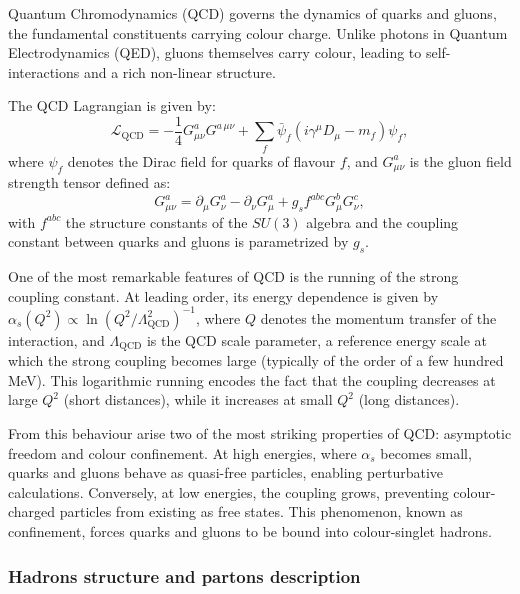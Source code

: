 Quantum Chromodynamics (QCD) governs the dynamics of quarks and gluons, the fundamental constituents carrying colour charge. Unlike photons in Quantum Electrodynamics (QED), gluons themselves carry colour, leading to self-interactions and a rich non-linear structure.

The QCD Lagrangian is given by:
\begin{equation}
\mathcal{L}_{\mathrm{QCD}} = -\frac{1}{4} G^{a}_{\mu\nu} G^{a\,\mu\nu} + \sum_{f} \bar{\psi}_f \left( i \gamma^\mu D_\mu - m_f \right) \psi_f,
\end{equation}
where \(\psi_f\) denotes the Dirac field for quarks of flavour \(f\), and \(G^a_{\mu\nu}\) is the gluon field strength tensor defined as:
\begin{equation}
G^a_{\mu\nu} = \partial_\mu G^a_\nu - \partial_\nu G^a_\mu + g_s f^{abc} G^b_\mu G^c_\nu,
\end{equation}
with \(f^{abc}\) the structure constants of the \(SU(3)\) algebra and the coupling constant between quarks and gluons is parametrized by \(g_s\).

One of the most remarkable features of QCD is the running of the strong coupling constant. At leading order, its energy dependence is given by $\alpha_s(Q^2) \propto \ln\!\left({Q^2}/{\Lambda_{\mathrm{QCD}}^2}\right)^{-1}$,
where \(Q\) denotes the momentum transfer of the interaction, and \(\Lambda_{\mathrm{QCD}}\) is the QCD scale parameter, a reference energy scale at which the strong coupling becomes large (typically of the order of a few hundred MeV). This logarithmic running encodes the fact that the coupling decreases at large \(Q^2\) (short distances), while it increases at small \(Q^2\) (long distances).  

From this behaviour arise two of the most striking properties of QCD: asymptotic freedom and colour confinement. At high energies, where \(\alpha_s\) becomes small, quarks and gluons behave as quasi-free particles, enabling perturbative calculations. Conversely, at low energies, the coupling grows, preventing colour-charged particles from existing as free states. This phenomenon, known as confinement, forces quarks and gluons to be bound into colour-singlet hadrons.

\subsubsection*{Hadrons structure and partons description}
\label{subsec:proton}

